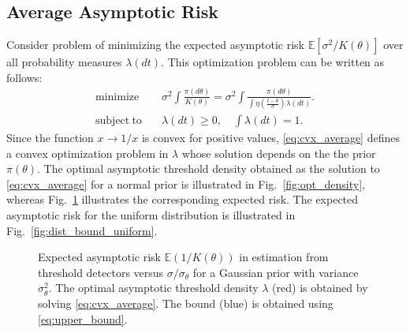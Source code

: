 \documentclass[letterpaper, conference]{IEEEtran}      %
\begin{document}
\subsection{Average Asymptotic Risk}
Consider problem of minimizing the expected asymptotic risk $\mathbb E[ \sigma^2/K(\theta)]$ over all probability measures $\lambda(dt)$. This optimization problem can be written as follows:
\begin{align}
\label{eq:cvx_average}
\mathrm{minimize} \quad &  \sigma^2 \int \frac{\pi(d\theta)}{K(\theta)} =  \sigma^2 \int \frac{\pi(d\theta)}{ \int \eta \left( \frac{t-\theta}{\sigma}\right) \lambda(dt)}. \\ \nonumber
\mathrm{subject~to} \quad & \lambda(dt)\geq 0,\quad \int \lambda(dt) =1. 
\end{align}
Since the function $x \rightarrow 1/x$ is convex for positive values, \eqref{eq:cvx_average} defines a convex optimization problem in $\lambda$ whose solution depends on the the prior $\pi(\theta)$. The optimal asymptotic threshold density obtained as the solution to \eqref{eq:cvx_average} for a normal prior is illustrated in Fig.~\ref{fig:opt_density}, whereas Fig.~\ref{fig:dist_bound_Gaussian} illustrates the corresponding expected risk. The expected asymptotic risk for the uniform distribution is illustrated in Fig.~\ref{fig:dist_bound_uniform}. 
\par
%
\begin{figure}
\begin{center}
\caption{Expected asymptotic risk $\mathbb E (1/K(\theta))$ in estimation from threshold detectors versus $\sigma/\sigma_\theta$ for a Gaussian prior with variance $\sigma_\theta^2$. The optimal asymptotic threshold density $\lambda$ (red) is obtained by solving \eqref{eq:cvx_average}. The bound (blue) is obtained using \eqref{eq:upper_bound}.
\label{fig:dist_bound_Gaussian}  }
\end{center}
\end{figure}
%
\end{document}
